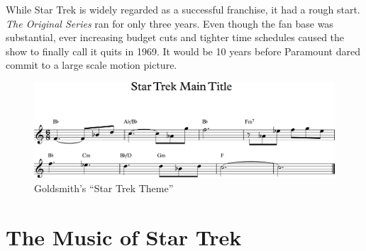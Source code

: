 While Star Trek is widely regarded as a successful franchise, it had a rough start. \textit{The Original Series} ran for only three years. Even though the fan base was substantial, ever increasing budget cuts and tighter time schedules caused the show to finally call it quits in 1969. It would be 10 years before Paramount dared commit to a large scale motion picture. \parencite[87]{bond_music_1998}



\begin{figure}
\includegraphics[width=\linewidth]{gfx/snippet_main_theme}
\caption{Goldsmith's ``Star Trek Theme''}
\end{figure}

\section{The Music of Star Trek}

